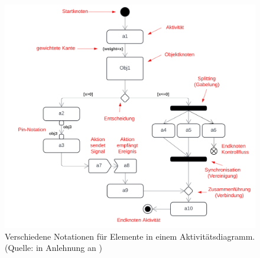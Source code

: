\begin{figure}
    \centering
    \includegraphics[scale=0.35]{part three/Aktivitätsdiagramme/img/aktivitätsdiagramm-notation}
    \caption{Verschiedene Notationen für Elemente in einem Aktivitätsdiagramm. (Quelle: in Anlehnung an \cite[326, Abb. 6.9-16]{Bal05})}
    \label{fig:aktivitätsdiagramm-notation-cc}
\end{figure}